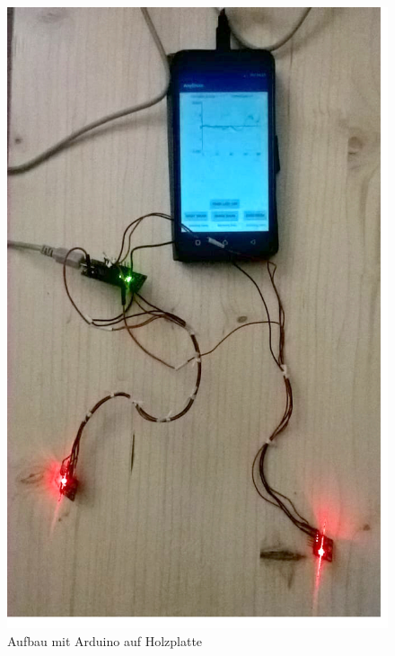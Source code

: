 \begin{figure}[H]
	\centering
	\includegraphics[scale=0.25]{figures/aufbau.jpg}
	\caption{Aufbau mit Arduino auf Holzplatte}
	\label{fig:app}
\end{figure}

